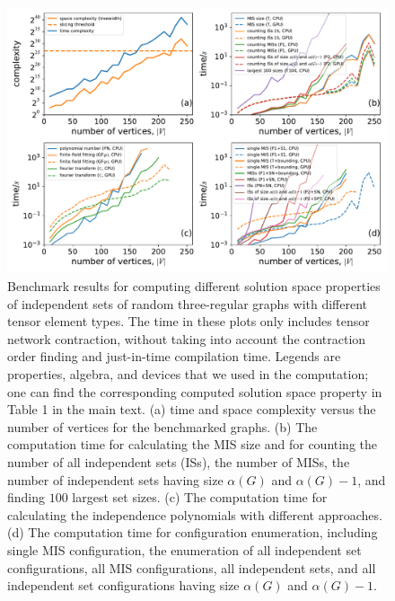 \documentclass[review,supplement,onefignum,onetabnum]{siamart190516}
\begin{document}
\begin{figure} 
    \centering
    \includegraphics[width=\textwidth, trim={0cm 0cm 0cm 0cm}, clip]{figures/fig1.pdf}
    \caption{Benchmark results for computing different solution space properties of independent sets of random three-regular graphs with different tensor element types.
    The time in these plots only includes tensor network contraction, without taking into account the contraction order finding and just-in-time compilation time.
    Legends are properties, algebra, and devices that we used in the computation; one can find the corresponding computed solution space property in Table 1 in the main text.
    (a) time and space complexity versus the number of vertices for the benchmarked graphs.
    (b) The computation time for calculating the MIS size and for counting the number of all independent sets (ISs), the number of MISs,
        the number of independent sets having size $\alpha(G)$ and $\alpha(G)-1$, and finding $100$ largest set sizes.
    (c) The computation time for calculating the independence polynomials with different approaches.
    (d) The computation time for configuration enumeration, including single MIS configuration, the enumeration of all independent set configurations, all MIS configurations, all independent sets,
    and all independent set configurations having size $\alpha(G)$ and $\alpha(G)-1$.
    }
    \label{fig:benchmark}
\end{figure}
\end{document}
